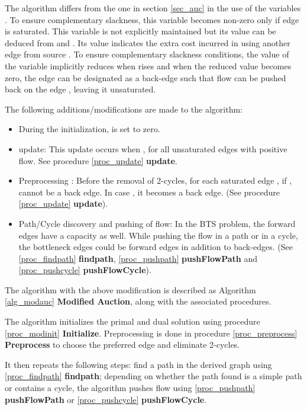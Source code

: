 \documentclass[11pt]{article}
\newcounter{rem}
\begin{document}
The algorithm differs from the one in section \ref{sec_auc} in  the
use of the variables . 
To ensure complementary slackness,
this variable becomes non-zero only if 
edge  is saturated. 
This variable is not explicitly maintained but its value can be deduced from
 and .
Its value indicates the extra cost incurred in
using another edge from source .
To ensure complementary slackness conditions,
the value of the variable  implicitly reduces when 
rises and when 
the reduced value becomes zero, the edge  can be designated as a back-edge
such that flow can be pushed back on 
the edge , leaving it unsaturated.


The following additions/modifications are made to the algorithm:

\begin{itemize}

\item
During the initialization,  is set to zero.

\item
 update: This update occurs when  ,
for all unsaturated edges with positive flow. 
See procedure \ref{proc_update}
{\bf update}.

\item
Preprocessing : Before the removal of 2-cycles, for each saturated edge
, if ,  cannot be  a back edge. In case 
, it becomes a back edge. (See procedure \ref{proc_update} 
{\bf update}).


\item
Path/Cycle discovery  and pushing 
of flow: In the BTS problem, the forward edges have a capacity 
as well. While pushing the flow in a path or in a cycle, the bottleneck edges 
could be forward edges in addition to back-edges. 
(See \ref{proc_findpath} {\bf findpath}, \ref{proc_pushpath} {\bf
pushFlowPath} and \ref{proc_pushcycle} {\bf pushFlowCycle}).

\end{itemize}

The algorithm with the above modification is described as Algorithm \ref{alg_modauc} 
{\bf Modified Auction},
along with the associated procedures. 

The algorithm initializes the
primal and dual solution using procedure \ref{proc_modinit} {\bf Initialize}. 
Preprocessing is done in procedure \ref{proc_preprocess} {\bf Preprocess}
to choose the 
preferred edge and eliminate 2-cycles.

It then repeats the following steps:  find a path in the derived 
graph using \ref{proc_findpath} {\bf findpath}; depending on whether the path found
is a simple 
path or contains a cycle, the algorithm pushes flow  using \ref{proc_pushpath} {\bf pushFlowPath} or 
\ref{proc_pushcycle} {\bf pushFlowCycle}. 
\end{document}
